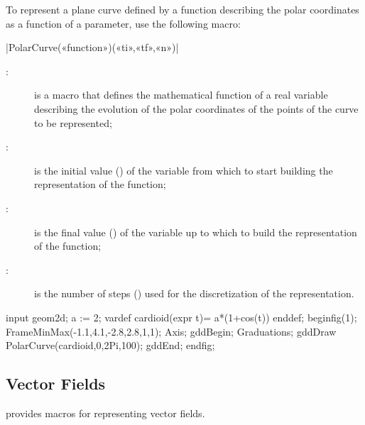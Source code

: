 \documentclass[a4paper,english]{article}
\begin{document}
  To represent a plane curve defined by a function describing the polar coordinates as a function of a parameter, use the following macro:
  \begin{colourband}
    \macro|PolarCurve(«function»)(«ti»,«tf»,«n»)|
    \begin{description}
      \item[:] is a \MP{} macro that defines the mathematical function of a real variable describing the evolution of the polar coordinates of the points of the curve to be represented;
      \item[:] is the initial value () of the variable from which to start building the representation of the function;
      \item[:] is the final value () of the variable up to which to build the representation of the function;
      \item[:] is the number of steps () used for the discretization of the representation.
    \end{description}
  \end{colourband}


\begin{ExempleMP}
input geom2d;
a := 2;
vardef cardioid(expr t)= a*(1+cos(t)) enddef;
beginfig(1);
FrameMinMax(-1.1,4.1,-2.8,2.8,1,1);
Axis;
gddBegin;
  Graduations;
  gddDraw PolarCurve(cardioid,0,2Pi,100);
gddEnd;
endfig;
\end{ExempleMP}


\subsection{Vector Fields}

\mpgeomdd provides macros for representing vector fields.
\end{document}
